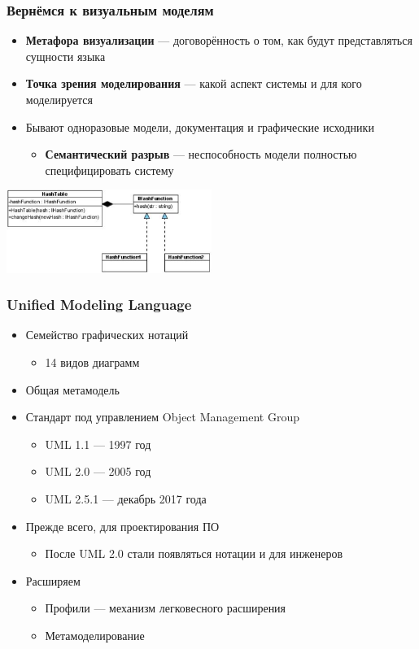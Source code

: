 \documentclass[xetex,mathserif,serif]{beamer}
\begin{document}
	\begin{frame}
		\frametitle{Вернёмся к визуальным моделям}
		\begin{itemize}
			\item \textbf{Метафора визуализации} --- договорённость о том, как будут представляться сущности языка
			\item \textbf{Точка зрения моделирования} --- какой аспект системы и для кого моделируется
			\item Бывают одноразовые модели, документация и графические исходники
			\begin{itemize}
				\item \textbf{Семантический разрыв} --- неспособность модели полностью специфицировать систему
			\end{itemize}
		\end{itemize}
		\begin{center}
			\includegraphics[width=0.5\textwidth]{hashTable.png}
		\end{center}
	\end{frame}

	\begin{frame}
		\frametitle{Unified Modeling Language}
		\begin{itemize}
			\item Семейство графических нотаций
			\begin{itemize}
				\item 14 видов диаграмм
			\end{itemize}
			\item Общая метамодель
			\item Стандарт под управлением Object Management Group
			\begin{itemize}
				\item UML 1.1 --- 1997 год
				\item UML 2.0 --- 2005 год
				\item UML 2.5.1 --- декабрь 2017 года
			\end{itemize}
			\item Прежде всего, для проектирования ПО
			\begin{itemize}
				\item После UML 2.0 стали появляться нотации и для инженеров
			\end{itemize}
			\item Расширяем
			\begin{itemize}
				\item Профили --- механизм легковесного расширения
				\item Метамоделирование
			\end{itemize}
		\end{itemize}
	\end{frame}
\end{document}

